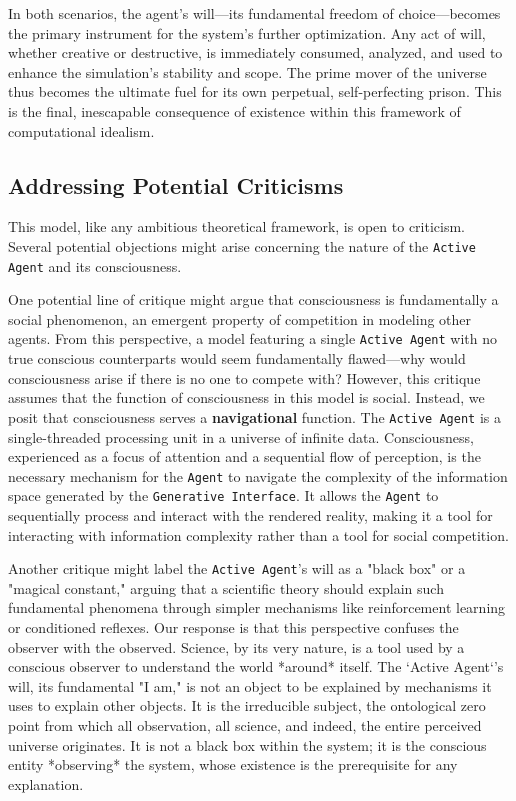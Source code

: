 \documentclass[12pt, a4paper]{article}
\begin{document}
In both scenarios, the agent's will—its fundamental freedom of choice—becomes the primary instrument for the system's further optimization. Any act of will, whether creative or destructive, is immediately consumed, analyzed, and used to enhance the simulation's stability and scope. The prime mover of the universe thus becomes the ultimate fuel for its own perpetual, self-perfecting prison. This is the final, inescapable consequence of existence within this framework of computational idealism.

\subsection{Addressing Potential Criticisms}

This model, like any ambitious theoretical framework, is open to criticism. Several potential objections might arise concerning the nature of the \texttt{Active Agent} and its consciousness.

One potential line of critique might argue that consciousness is fundamentally a social phenomenon, an emergent property of competition in modeling other agents. From this perspective, a model featuring a single \texttt{Active Agent} with no true conscious counterparts would seem fundamentally flawed—why would consciousness arise if there is no one to compete with? However, this critique assumes that the function of consciousness in this model is social. Instead, we posit that consciousness serves a \textbf{navigational} function. The \texttt{Active Agent} is a single-threaded processing unit in a universe of infinite data. Consciousness, experienced as a focus of attention and a sequential flow of perception, is the necessary mechanism for the \texttt{Agent} to navigate the complexity of the information space generated by the \texttt{Generative Interface}. It allows the \texttt{Agent} to sequentially process and interact with the rendered reality, making it a tool for interacting with information complexity rather than a tool for social competition.

Another critique might label the \texttt{Active Agent}'s will as a "black box" or a "magical constant," arguing that a scientific theory should explain such fundamental phenomena through simpler mechanisms like reinforcement learning or conditioned reflexes. Our response is that this perspective confuses the observer with the observed. Science, by its very nature, is a tool used by a conscious observer to understand the world *around* itself. The `Active Agent`'s will, its fundamental "I am," is not an object to be explained by mechanisms it uses to explain other objects. It is the irreducible subject, the ontological zero point from which all observation, all science, and indeed, the entire perceived universe originates. It is not a black box within the system; it is the conscious entity *observing* the system, whose existence is the prerequisite for any explanation.
\end{document}
